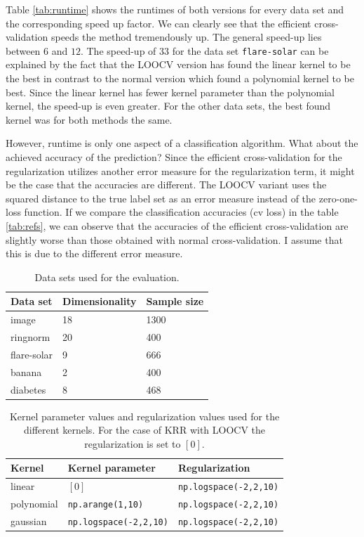 \documentclass[a4paper, 11pt, titlepage]{article}
\begin{document}
Table \ref{tab:runtime} shows the runtimes of both versions for every data set and the corresponding speed up factor.
We can clearly see that the efficient cross-validation speeds the method tremendously up.
The general speed-up lies between $6$ and $12$.
The speed-up of $33$ for the data set \texttt{flare-solar} can be explained by the fact that the LOOCV version has found the linear kernel to be the best in contrast to the normal version which found a polynomial kernel to be best.
Since the linear kernel has fewer kernel parameter than the polynomial kernel, the speed-up is even greater.
For the other data sets, the best found kernel was for both methods the same.

However, runtime is only one aspect of a classification algorithm.
What about the achieved accuracy of the prediction?
Since the efficient cross-validation for the regularization utilizes another error measure for the regularization term, it might be the case that the accuracies are different.
The LOOCV variant uses the squared distance to the true label set as an error measure instead of the zero-one-loss function.
If we compare the classification accuracies (cv loss) in the table \ref{tab:refs}, we can observe that the accuracies of the efficient cross-validation are slightly worse than those obtained with normal cross-validation.
I assume that this is due to the different error measure.

\begin{table}
	\centering
	\begin{tabular}{lll}
		Data set & Dimensionality & Sample size\\
		\hline
		image&18&1300\\
		ringnorm &20&400\\
		flare-solar &9&666\\
		banana &2& 400\\
		diabetes &8&468
	\end{tabular}
	\caption{Data sets used for the evaluation.}
	\label{tab:datasets}
\end{table}

\begin{table}
	\centering
	\begin{tabular}{lll}
		Kernel & Kernel parameter & Regularization\\
		\hline
		linear & $[0]$ & \texttt{np.logspace(-2,2,10)} \\
		polynomial & \texttt{np.arange(1,10)} & \texttt{np.logspace(-2,2,10)}\\
		gaussian & \texttt{np.logspace(-2,2,10)} & \texttt{np.logspace(-2,2,10)}
	\end{tabular}
	\caption{Kernel parameter values and regularization values used for the different kernels. For the case of KRR with LOOCV the regularization is set to $[0]$.}
	\label{tab:parametervalues}
\end{table}
\end{document}

